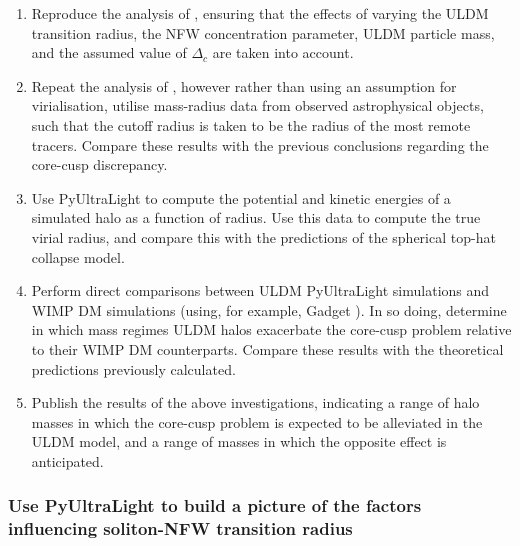 \begin{enumerate}
    \item Reproduce the analysis of \cite{Robles:2018fur}, ensuring that the effects of varying the ULDM transition radius, the NFW concentration parameter, ULDM particle mass, and the assumed value of $\Delta_c$ are taken into account.
    \item Repeat the analysis of \cite{Robles:2018fur}, however rather than using an assumption for virialisation, utilise mass-radius data from observed astrophysical objects, such that the cutoff radius is taken to be the radius of the most remote tracers. Compare these results with the previous conclusions regarding the core-cusp discrepancy.
    \item Use PyUltraLight to compute the potential and kinetic energies of a simulated halo as a function of radius. Use this data to compute the true virial radius, and compare this with the predictions of the spherical top-hat collapse model.
    \item Perform direct comparisons between ULDM PyUltraLight simulations and WIMP DM simulations (using, for example, Gadget \cite{Springel:2005mi}). In so doing, determine in which mass regimes ULDM halos exacerbate the core-cusp problem relative to their WIMP DM counterparts. Compare these results with the theoretical predictions previously calculated. 
    \item Publish the results of the above investigations, indicating a range of halo masses in which the core-cusp problem is expected to be alleviated in the ULDM model, and a range of masses in which the opposite effect is anticipated. 
\end{enumerate}


\subsubsection{Use PyUltraLight to build a picture of the factors influencing soliton-NFW transition radius}

